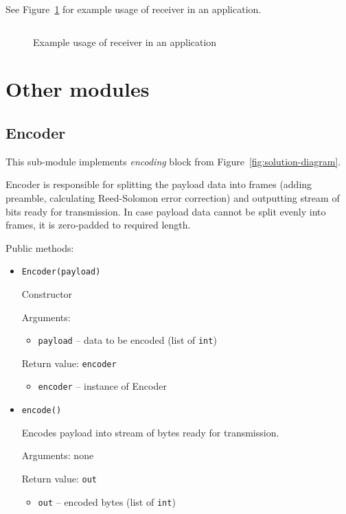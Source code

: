 See Figure~\ref{fig:receiver-application} for example usage of receiver in an application.

\clearpage

\begin{figure}[h]
\centering
\inputminted[linenos]{python}{listings/receiver_example.py}
\caption{Example usage of receiver in an application}
\label{fig:receiver-application}
\end{figure}

\section{Other modules}

\subsection{Encoder}

This sub-module implements \emph{encoding} block from Figure~\ref{fig:solution-diagram}.

Encoder is responsible for splitting the payload data into frames (adding preamble, calculating Reed-Solomon error correction) and outputting stream of bits ready for transmission. In case payload data cannot be split evenly into frames, it is zero-padded to required length.

Public methods:

\begin{itemize}
\item \verb|Encoder(payload)|

  Constructor

  Arguments:
  \begin{itemize}
  \item \verb|payload| -- data to be encoded (list of \verb|int|)
  \end{itemize}

  Return value: \verb|encoder|
  \begin{itemize}
  \item \verb|encoder| -- instance of Encoder
  \end{itemize}

\item \verb|encode()|

  Encodes payload into stream of bytes ready for transmission.

  Arguments: none

  Return value: \verb|out|
  \begin{itemize}
  \item \verb|out| -- encoded bytes (list of \verb|int|)
  \end{itemize}

\end{itemize}

